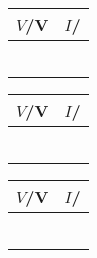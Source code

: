 \begin{minipage}{0.3\textwidth}
\begin{tabular}{|p{2cm}|p{2cm}|}
\hline
\multicolumn{1}{|c|}{$V$/V} & \multicolumn{1}{|c|}{$I$/}\\
\hline
&\\
\hline
&\\
\hline
& \\
\hline
& \\
\hline
& \\
\hline
& \\
\hline
\end{tabular}
\end{minipage}
\begin{minipage}{0.3\textwidth}
\begin{tabular}{|p{2cm}|p{2cm}|}
\hline
\multicolumn{1}{|c|}{$V$/V} & \multicolumn{1}{|c|}{$I$/}\\
\hline
&\\
\hline
&\\
\hline
& \\
\hline
& \\
\hline
& \\
\hline
& \\
\hline
\end{tabular}
\end{minipage}
\begin{minipage}{0.3\textwidth}
\begin{tabular}{|p{2cm}|p{2cm}|}
\hline
\multicolumn{1}{|c|}{$V$/V} & \multicolumn{1}{|c|}{$I$/}\\
\hline
&\\
\hline
&\\
\hline
& \\
\hline
& \\
\hline
& \\
\hline
& \\
\hline
\end{tabular}
\end{minipage}

